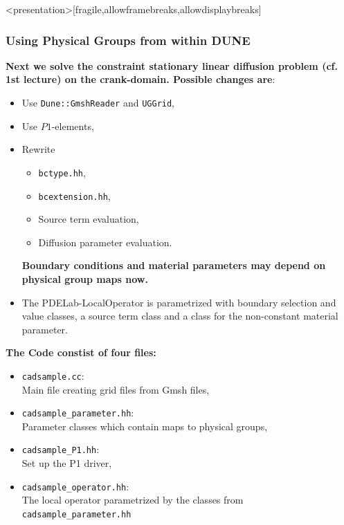 \begin{frame}<presentation>[fragile,allowframebreaks,allowdisplaybreaks]
  \frametitle{Using Physical Groups from within DUNE}
  \textbf{Next we solve the constraint stationary linear diffusion problem
  (cf. 1st lecture) on the crank-domain. Possible changes are}:
  \begin{itemize}
    \item Use \lstinline!Dune::GmshReader! and \lstinline!UGGrid!,
    \item Use $P1$-elements,
    \item Rewrite
      \begin{itemize}
        \item \lstinline!bctype.hh!,
        \item \lstinline!bcextension.hh!,
        \item Source term evaluation,
        \item Diffusion parameter evaluation.
      \end{itemize}
      \textbf{Boundary conditions and material parameters may depend on physical group
      maps now.}
    \item The PDELab-LocalOperator is parametrized with boundary selection and value
      classes, a source term class and a class for the non-constant material
      parameter.
  \end{itemize}
  \textbf{The Code constist of four files:}
  \begin{itemize}
    \item \lstinline!cadsample.cc!:\\ Main file creating grid files from Gmsh files,
    \item \lstinline!cadsample_parameter.hh!:\\ Parameter classes which contain maps to
      physical groups,
    \item \lstinline!cadsample_P1.hh!:\\ Set up the P1 driver,
    \item \lstinline!cadsample_operator.hh!:\\ The local operator parametrized by the
      classes from \lstinline!cadsample_parameter.hh!
  \end{itemize}
\end{frame}

